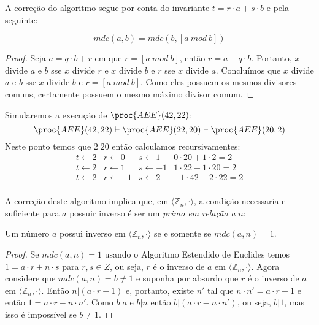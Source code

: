 A correção do algoritmo segue por conta do invariante $t = r \cdot a + s \cdot b$ e pela seguinte:

\begin{proposition}
\begin{displaymath}
  mdc(a,b) = mdc(b, [a\ mod\ b])  
\end{displaymath}
\end{proposition}
\begin{proof}

Seja $a = q \cdot b + r$ em que $r = [a\ mod\ b]$, então $r = a - q \cdot b$.
Portanto, $x$ divide $a$ e $b$ sse $x$ divide $r$ e $x$ divide $b$ e $r$ sse $x$ divide $a$.
Concluímos que $x$ divide $a$ e $b$ sse $x$ divide $b$ e $r = [a\ mod\ b]$.
Como eles possuem os mesmos divisores comuns, certamente possuem o mesmo máximo divisor comum.
\end{proof}

\begin{example}
    Simularemos a execução de $\proc{AEE}(42, 22)$:
    \begin{displaymath}
      \proc{AEE}(42, 22) \vdash \proc{AEE}(22, 20) \vdash \proc{AEE}(20, 2)
    \end{displaymath}
    Neste ponto temos que $2|20$ então calculamos recursivamentes:
    \begin{displaymath}
      \begin{array}{lllr}
        t \gets 2 & r \gets 0 & s \gets 1 & 0 \cdot 20 + 1 \cdot 2 = 2\\
        t \gets 2 & r \gets 1 & s \gets -1 & 1 \cdot 22 - 1 \cdot 20 = 2\\
        t \gets 2 & r \gets -1 & s \gets 2 & -1 \cdot 42 + 2 \cdot 22 = 2\\
      \end{array}
    \end{displaymath}
\end{example}

A correção deste algoritmo implica que, em $\langle \mathbb{Z}_n, \cdot \rangle$, a condição necessaria e suficiente para $a$ possuir inverso é ser um {\em primo em relação a} $n$:

\begin{proposition}
Um número $a$ possui inverso em $\langle \mathbb{Z}_n, \cdot \rangle$ se e somente se $mdc(a,n) = 1$.
\end{proposition}
\begin{proof}
  Se $mdc(a, n) = 1$ usando o Algoritmo Estendido de Euclides temos $1 = a \cdot r + n \cdot s$ para $r, s \in Z$, ou seja, $r$ é o inverso de $a$ em $\langle \mathbb{Z}_n, \cdot \rangle$.
Agora considere que $mdc(a, n) = b \neq 1$ e suponha por absurdo que $r$ é o
inverso de $a$ em $\langle \mathbb{Z}_n , \cdot \rangle$. 
Então $n|(a \cdot r - 1)$ e, portanto, existe $n'$ tal que $n \cdot n' = a \cdot r - 1$ e então $1 = a \cdot r - n \cdot n'$. 
Como $b|a$ e $b|n$ então $b|(a \cdot r - n \cdot n')$, ou seja, $b|1$, mas isso é impossível se $b \neq 1$.
\end{proof}


